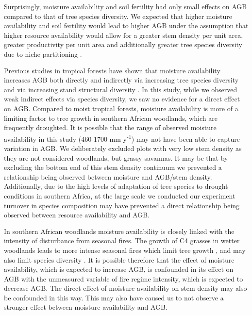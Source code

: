 \documentclass[11pt,a4paper]{article}
\newcommand{\textapprox}{\raisebox{0.5ex}{\texttildelow}}  %
\begin{document}
Surprisingly, moisture availability and soil fertility had only small effects on AGB compared to that of tree species diversity. We expected that higher moisture availability and soil fertility would lead to higher AGB under the assumption that higher resource availability would allow for a greater stem density per unit area, greater productivity per unit area and additionally greater tree species diversity due to niche partitioning \citep{Kraaij2006, Shirima2015}.

Previous studies in tropical forests have shown that moisture availability increases AGB both directly and indirectly via increasing tree species diversity and via increasing stand structural diversity \citep{Ali2019a, Ali2019b, Poorter2017}. In this study, while we observed weak indirect effects via species diversity, we saw no evidence for a direct effect on AGB. Compared to moist tropical forests, moisture availability is more of a limiting factor to tree growth in southern African woodlands, which are frequently droughted. It is possible that the range of observed moisture availability in this study (\textapprox{}460-1700 mm y\textsuperscript{-1}) may not have been able to capture variation in AGB. We deliberately excluded plots with very low stem density as they are not considered woodlands, but grassy savannas. It may be that by excluding the bottom end of this stem density continuum we prevented a relationship being observed between moisture and AGB/stem density. Additionally, due to the high levels of adaptation of tree species to drought conditions in southern Africa, at the large scale we conducted our experiment turnover in species composition may have prevented a direct relationship being observed between resource availability and AGB.

In southern African woodlands moisture availability is closely linked with the intensity of disturbance from seasonal fires. The growth of C4 grasses in wetter woodlands leads to more intense seasonal fires which limit tree growth \citep{Charles-Dominique2018}, and may also limit species diversity \citep{Linder2014}. It is possible therefore that the effect of moisture availability, which is expected to increase AGB, is confounded in its effect on AGB with the unmeasured variable of fire regime intensity, which is expected to decrease AGB. The direct effect of moisture availability on stem density may also be confounded in this way. This may also have caused us to not observe a stronger effect between moisture availability and AGB.
\end{document}
